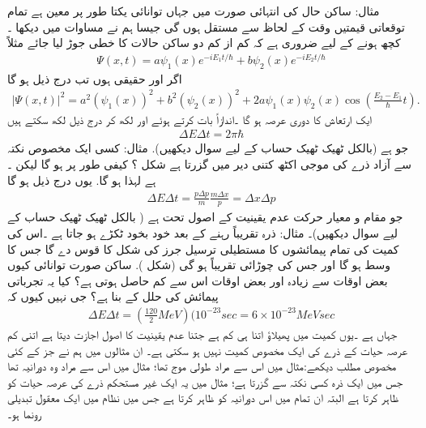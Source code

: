 {مثال: ساکن حال کی انتہائی صورت میں جہاں توانائی یکتا طور پر معین ہے تمام توقعاتی قیمتیں وقت کے لحاظ سے مستقل ہوں گی  جیسا ہم نے مساوات میں دیکھا ۔کچھ ہونے کے لیے ضروری ہے کہ کم از کم دو ساکن حالات کا خطی جوڑ لیا جائے مثلاً 
\begin{align*}
\Psi (x,t) = a\psi_{1}(x)e^{-iE_{1}t/\hbar} + b\psi_{2}(x)e^{-iE_{2}t/\hbar}
\end{align*}
اگر اور حقیقی  ہوں تب درج ذیل ہو گا
\begin{align*}
| \Psi(x,t)|^{2} = a^{2}(\psi_{1}(x))^{2} + b^{2}(\psi_{2}(x))^{2} + 2a\psi_{1}(x)\psi_{2}(x)\cos \left( \frac{E_{2}-E_{1}}{\hbar} t \right).
\end{align*}
ایک ارتعاش کا دوری عرصہ  ہو گا ۔اندازاً بات کرتے ہوئے  اور  لکھ کر درج ذیل لکھ سکتے ہیں
\begin{align*}
\Delta E \Delta t = 2\pi\hbar
\end{align*}
جو  ہے (بالکل ٹھیک ٹھیک حساب کے لیے  سوال دیکھیں).
مثال: کسی ایک مخصوص نکتہ سے آزاد ذرے کی موجی اکٹھ کتنی دیر میں گزرتا ہے شکل ؟ کیفی طور پر  ہو گا لیکن  ۔ہے لہذا  ہو گا. یوں درج ذیل ہو گا
\begin{align*}
\Delta E \Delta t = \frac{p\Delta p}{m} \frac{m\Delta x}{p} = \Delta x \Delta p
\end{align*}
جو مقام و معیار حرکت عدم یقینیت کے اصول تحت  ہے ( بالکل ٹھیک ٹھیک حساب کے لیے سوال  دیکھیں)۔
مثال: ذرہ  تقریباً  رہنے کے بعد خود بخود ٹکڑے ہو جاتا ہے ۔اس کی کمیت کی تمام پیمائشوں کا مستطیلی ترسیل جرز کی شکل کا قوس دے گا جس کا وسط  ہو گا اور جس کی چوڑائی تقریباً  ہو گی (شکل ). ساکن صورت توانائی  کیوں بعض اوقات  سے زیادہ اور بعض اوقات اس سے کم حاصل ہوتی ہے؟ کیا یہ تجرباتی پیمائش کی حلل کے بنا ہے؟ جی نہیں کیوں کہ 
\begin{align*}
\Delta E \Delta t = \left( \frac{120}{2} MeV \right)  ( 10^{-23} sec = 6 \times 10^{-23} MeV sec
\end{align*}
جہاں  ہے ۔یوں کمیت میں پھیلاؤ اتنا ہی کم ہے جتنا عدم یقینیت کا اصول اجازت دیتا ہے اتنی کم عرصہ حیات کے ذرے کی ایک مخصوص کمیت نہیں ہو سکتی ہے۔ ان مثالوں میں ہم نے جز  کے کئی مخصوص مطلب دیکھے:مثال  میں اس سے مراد طولی موج تھا؛ مثال  میں اس سے مراد وہ دورانیہ تھا جس میں ایک ذرہ کسی نکتہ سے گزرتا ہے؛ مثال  میں یہ ایک غیر مستحکم ذرے کی عرصہ حیات کو ظاہر کرتا ہے البتہ ان تمام میں  اس دورانیہ کو ظاہر کرتا ہے جس میں نظام میں ایک معقول تبدیلی رونما ہو۔
}
